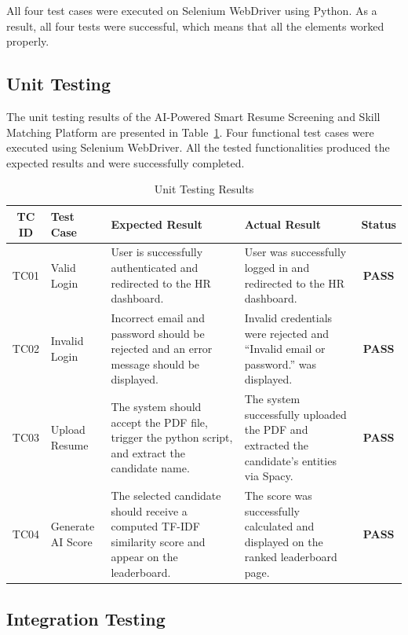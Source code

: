 \documentclass[12pt,a4paper]{report}
\begin{document}
All four test cases were executed on Selenium WebDriver using Python. As a result, all four tests were successful, which means that all the elements worked properly.

\subsection{Unit Testing}

The unit testing results of the AI-Powered Smart Resume Screening and Skill Matching Platform are presented in Table~\ref{tab:unit_testing_results}. Four functional test cases were executed using Selenium WebDriver. All the tested functionalities produced the expected results and were successfully completed.

\begin{table}[h]
\centering
\renewcommand{\arraystretch}{1.3}
\begin{tabular}{|c|p{3.2cm}|p{4.2cm}|p{4.2cm}|c|}
\hline
\textbf{TC ID} & \textbf{Test Case} & \textbf{Expected Result} & \textbf{Actual Result} & \textbf{Status} \\
\hline

TC01 &
Valid Login &
User is successfully authenticated and redirected to the HR dashboard. &
User was successfully logged in and redirected to the HR dashboard. &
\textbf{PASS} \\
\hline

TC02 &
Invalid Login &
Incorrect email and password should be rejected and an error message should be displayed. &
Invalid credentials were rejected and ``Invalid email or password.'' was displayed. &
\textbf{PASS} \\
\hline

TC03 &
Upload Resume &
The system should accept the PDF file, trigger the python script, and extract the candidate name. &
The system successfully uploaded the PDF and extracted the candidate's entities via Spacy. &
\textbf{PASS} \\
\hline

TC04 &
Generate AI Score &
The selected candidate should receive a computed TF-IDF similarity score and appear on the leaderboard. &
The score was successfully calculated and displayed on the ranked leaderboard page. &
\textbf{PASS} \\
\hline

\end{tabular}
\caption{Unit Testing Results}
\label{tab:unit_testing_results}
\end{table}
\subsection{Integration Testing}
\end{document}
